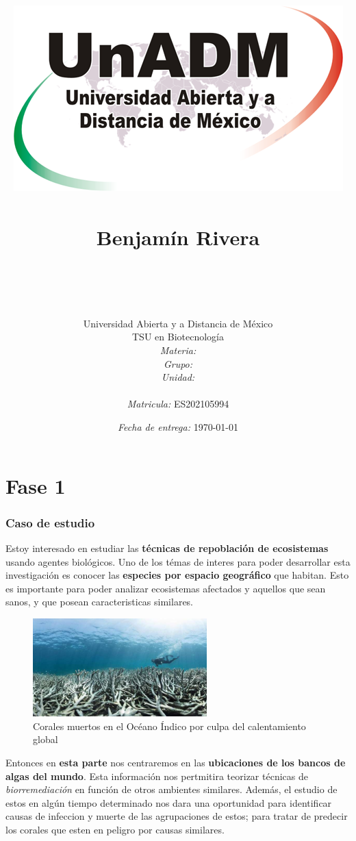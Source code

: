 \documentclass[12pt]{article}
\title{
	\includegraphics{../../../assets/logo-unadm} \\
	\ \\ Benjam\'in Rivera \\
	\bf{\titulo}\\\ \\}
\author{
	Universidad Abierta y a Distancia de México \\
	TSU en Biotecnolog\'ia \\
	\textit{Materia:} \materia \\
	\textit{Grupo:} \grupo \\
	\textit{Unidad:} \unidad \\
	\\
	\textit{Matricula:} ES202105994 }
\date{\textit{Fecha de entrega:} \today}
\begin{document}
\maketitle\newpage


\part*{Fase 1}


\section{Caso de estudio}


	\par Estoy interesado en estudiar las \textbf{t\'ecnicas de repoblaci\'on de ecosistemas} usando agentes biol\'ogicos. Uno de los t\'emas de interes para poder desarrollar esta investigaci\'on es conocer las \textbf{especies por espacio geogr\'afico} que habitan. Esto es importante para poder analizar ecosistemas afectados y aquellos que sean sanos, y que posean caracteristicas similares. 

	\begin{figure}[h]
		\centering
			\includegraphics[width=0.6\textwidth]{coral-muerto.jpg}
		\caption{Corales muertos en el Océano Índico por culpa del calentamiento global \cite{corales muertos}}
		\label{fig: corales muertos}
	\end{figure}
	

	\par Entonces en \textbf{esta parte} nos centraremos en las \textbf{ubicaciones de los bancos de algas del mundo}. Esta informaci\'on nos pertmitira teorizar t\'ecnicas de \textit{biorremediaci\'on} en funci\'on de otros ambientes similares. Adem\'as, el estudio de estos en alg\'un tiempo determinado nos dara una oportunidad para identificar causas de infeccion y muerte de las agrupaciones de estos; para tratar de predecir los corales que esten en peligro por causas similares.
\end{document}
